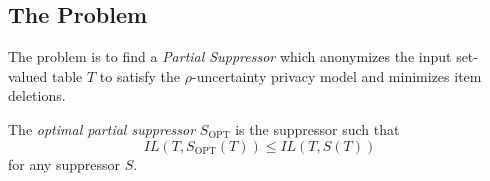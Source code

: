 
\subsection{The Problem}
The problem is to find a {\em Partial Suppressor} which anonymizes the input
set-valued table $T$ to satisfy the $\rho$-uncertainty privacy model and
minimizes item deletions.

\begin{definition}
The \emph{optimal partial suppressor} $S_\text{OPT}$ is the suppressor such that
\[ IL(T,S_\text{OPT}(T))\leq IL(T,S(T)) \] for any suppressor $S$.
\end{definition}

